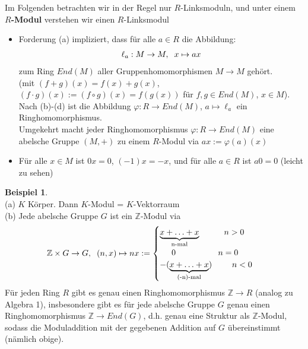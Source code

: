 \documentclass[10pt,a4paper,numbers=endperiod]{scrreprt}
\theoremstyle{definition}
\newtheorem{bsp}[satz]{Beispiel}
\def\ZZ{{\mathbb Z}}
\begin{document}
Im Folgenden betrachten wir in der Regel nur $R$-Linksmoduln, und unter einem \textbf{$R$-Modul} verstehen wir einen $R$-Linksmodul
\begin{itemize}
	\item Forderung (a) impliziert, dass für alle $a \in R$ die Abbildung:
	\begin{align*}
		\ell_a: M \rightarrow M, \hspace{2mm} x \mapsto ax
	\end{align*}
	zum Ring $End(M)$ aller Gruppenhomomorphismen $M \rightarrow M$ gehört.\\
	(mit $(f+g)(x) = f(x) + g(x)$, $(f \cdot g)(x) := (f \circ g)(x) = f(g(x))$ für $f, g \in End(M)$, $x \in M$).\\
	Nach (b)-(d) ist die Abbildung $\varphi: R \rightarrow End(M)$, $a \mapsto \ell_a$ ein Ringhomomorphismus.\\
	Umgekehrt macht jeder Ringhomomorphismus $\varphi: R \rightarrow End(M)$ eine abelsche Gruppe $(M,+)$ zu einem $R$-Modul via $ax := \varphi(a)(x)$
	\item  Für alle $x \in M$ ist $0x = 0$, $(-1)x = -x$, und für alle $a \in R$ ist $a0 = 0$ (leicht zu sehen)
\end{itemize}

\begin{bsp}
	$ $\\
	(a) $K$ Körper. Dann $K$-Modul = $K$-Vektorraum\\
	(b) Jede abelsche Gruppe $G$ ist ein $\ZZ$-Modul via \begin{align*}
		\ZZ \times G \rightarrow G, \hspace{2mm} (n,x) \mapsto nx := \begin{cases}
		\underbrace{x + \ldots + x}_{\text{n-mal}} \hspace{10 mm} n > 0\\
		\hspace{5mm} 0 \hspace{18mm} n = 0\\
		-(\underbrace{x + \ldots + x}_{\text{(-n)-mal}}) \hspace{8.5mm} n < 0
		\end{cases}
	\end{align*}
	Für jeden Ring $R$ gibt es genau einen Ringhomomorphismus $\ZZ \rightarrow R$ (analog zu Algebra 1), insbesondere gibt es für jede abelsche Gruppe $G$ genau einen Ringhomomorphismus $\ZZ \rightarrow End(G)$, d.h. genau eine Struktur als $\ZZ$-Modul, sodass die Moduladdition mit der gegebenen Addition auf $G$ übereinstimmt (nämlich obige).
\end{bsp}
\end{document}
